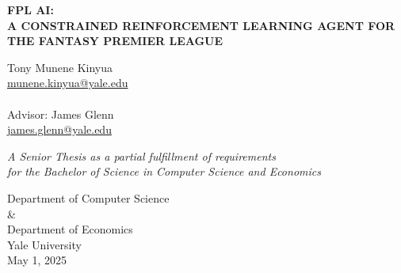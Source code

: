 \begin{titlepage}
    \begin{center}
        \vspace*{1cm}
        
        \huge
        \textbf{FPL AI: \\
        A CONSTRAINED REINFORCEMENT LEARNING AGENT FOR THE FANTASY PREMIER LEAGUE}
        
        \vspace{0.5cm}
        \LARGE
        
        \vspace{1cm}

        \Large
        Tony Munene Kinyua\\
        \href{munene.kinyua@yale.edu}{munene.kinyua@yale.edu}\\~\\
        Advisor: James Glenn\\
        \href{james.glenn@yale.edu}{james.glenn@yale.edu}
        
        \vfill
        
        \textit{A Senior Thesis as a partial fulfillment
        of requirements \\for the Bachelor of Science in Computer Science and Economics}
        
        \vspace{0.8cm}
        
        \Large
        Department of Computer Science\\
        \&\\
        Department of Economics\\
        Yale University\\
        May 1, 2025
        
    \end{center}
\end{titlepage}